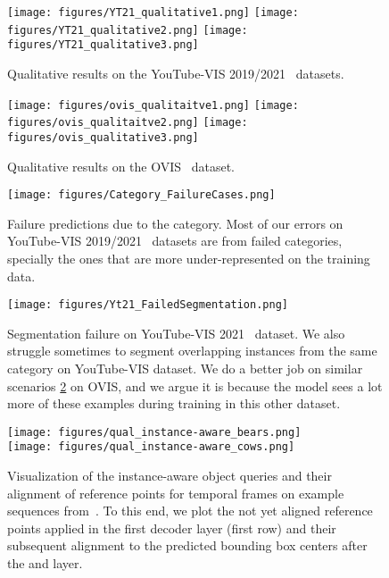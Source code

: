 \documentclass[runningheads]{llncs}
\begin{document}
\begin{figure}[t]
    \centering
    \texttt{[image: figures/YT21\_qualitative1.png]}
    \texttt{[image: figures/YT21\_qualitative2.png]}
    \texttt{[image: figures/YT21\_qualitative3.png]}
    \caption{
    Qualitative results on the YouTube-VIS 2019/2021~\cite{Yang2019vis} datasets.
    }
    \label{fig:qual_results_youtube}
\end{figure}
%
 \begin{figure}
    \centering
    \texttt{[image: figures/ovis\_qualitaitve1.png]}
    \texttt{[image: figures/ovis\_qualitaitve2.png]}
    \texttt{[image: figures/ovis\_qualitative3.png]}
    \caption{
    Qualitative results on the OVIS~\cite{ovis} dataset.
    }
    \label{fig:qual_results_ovis}
\end{figure}
%
 
\begin{figure}
    \centering
    \texttt{[image: figures/Category\_FailureCases.png]}
    \caption{
    Failure predictions due to the category. Most of our errors on YouTube-VIS 2019/2021~\cite{Yang2019vis} datasets are from failed categories, specially the ones that are more under-represented on the training data. 
    }
    \label{fig:qual_failure_category}
\end{figure} \begin{figure}
    \centering
    \texttt{[image: figures/Yt21\_FailedSegmentation.png]}
    \caption{
    Segmentation failure on YouTube-VIS 2021~\cite{Yang2019vis} dataset. We also struggle sometimes to segment overlapping instances from the same category on YouTube-VIS dataset. We do a better job on similar scenarios \ref{fig:qual_results_ovis} on OVIS, and we argue it is because the model sees a lot more of these examples during training in this other dataset. 
    }
    \label{fig:qual_failure_segm}

\end{figure} 
\begin{figure}
    \centering
    \texttt{[image: figures/qual\_instance-aware\_bears.png]}\\
    \vspace{+0.7cm}
    \texttt{[image: figures/qual\_instance-aware\_cows.png]}

    \caption{
    Visualization of the instance-aware object queries and their alignment of reference points for temporal frames on example sequences from~\cite{Yang2019vis}.
To this end, we plot the not yet aligned reference points applied in the first decoder layer (first row) and their subsequent alignment to the predicted bounding box centers after the  and  layer.
    }
    \label{fig:qual_results_instance_aware_queries}
\end{figure}
%
 










 \fi

\clearpage


\end{document}
